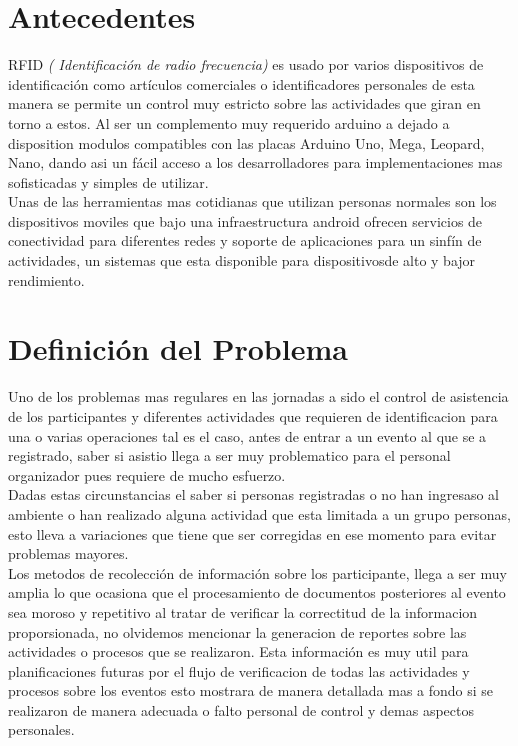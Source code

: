 \documentclass[letter,12pt]{article}
\begin{document}
\section{Antecedentes}

RFID \textit{( Identificaci\'on de radio frecuencia)} es usado por varios dispositivos de identificaci\'on como art\'iculos comerciales o identificadores personales de esta manera se permite un control muy estricto sobre las actividades que giran en torno a estos. Al ser un complemento muy requerido arduino a dejado a disposition modulos compatibles con las placas Arduino Uno, Mega, Leopard, Nano, dando asi un f\'acil acceso a los desarrolladores para implementaciones mas sofisticadas y simples de utilizar.\\

Unas de las herramientas mas cotidianas que utilizan personas normales son los  dispositivos moviles que bajo una infraestructura android ofrecen servicios de conectividad para diferentes redes y soporte de aplicaciones para un sinf\'in de actividades, un sistemas que esta disponible para dispositivosde alto y bajor rendimiento.

 
\section{Definici\'on del Problema}

Uno de los problemas mas regulares en las jornadas a sido el control de asistencia de los participantes y diferentes actividades que requieren de identificacion para una o varias operaciones tal es el caso, antes de entrar a un evento al que se a registrado, saber si asistio llega a ser muy problematico para el personal organizador pues requiere de mucho esfuerzo. \\

Dadas estas circunstancias el saber si personas registradas o no han ingresaso al ambiente o han realizado alguna actividad que esta limitada a un grupo personas, esto lleva a variaciones que tiene que ser corregidas en ese momento para evitar problemas mayores.\\

Los metodos de recolecci\'on de informaci\'on sobre los participante, llega a ser muy amplia lo que ocasiona que el procesamiento de documentos posteriores al evento sea moroso y repetitivo al tratar de verificar la correctitud de la informacion proporsionada, no olvidemos mencionar la generacion de reportes sobre las actividades o procesos que se realizaron. Esta informaci\'on es muy util para planificaciones futuras por el flujo de verificacion de todas las actividades y procesos sobre los eventos  esto mostrara de manera detallada mas a fondo si se realizaron de manera adecuada o falto personal de control y demas aspectos personales.
\end{document}
